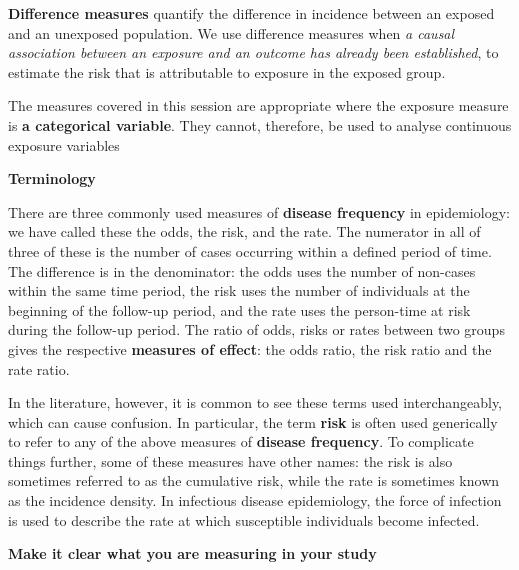 \documentclass[
  letterpaper,
  DIV=11,
  numbers=noendperiod]{scrreprt}
\begin{document}
\textbf{Difference measures} quantify the difference in incidence
between an exposed and an unexposed population. We use difference
measures when \emph{a causal association between an exposure and an
outcome has already been established}, to estimate the risk that is
attributable to exposure in the exposed group.

The measures covered in this session are appropriate where the exposure
measure is \textbf{a categorical variable}. They cannot, therefore, be
used to analyse continuous exposure variables

\begin{tcolorbox}[enhanced jigsaw, bottomtitle=1mm, breakable, colframe=quarto-callout-important-color-frame, leftrule=.75mm, opacityback=0, opacitybacktitle=0.6, left=2mm, colbacktitle=quarto-callout-important-color!10!white, coltitle=black, rightrule=.15mm, toptitle=1mm, colback=white, titlerule=0mm, title=\textcolor{quarto-callout-important-color}{\faExclamation}\hspace{0.5em}{Important}, arc=.35mm, bottomrule=.15mm, toprule=.15mm]

\textbf{Terminology}

There are three commonly used measures of \textbf{disease frequency} in
epidemiology: we have called these the odds, the risk, and the rate. The
numerator in all of three of these is the number of cases occurring
within a defined period of time. The difference is in the denominator:
the odds uses the number of non-cases within the same time period, the
risk uses the number of individuals at the beginning of the follow-up
period, and the rate uses the person-time at risk during the follow-up
period. The ratio of odds, risks or rates between two groups gives the
respective \textbf{measures of effect}: the odds ratio, the risk ratio
and the rate ratio.

In the literature, however, it is common to see these terms used
interchangeably, which can cause confusion. In particular, the term
\textbf{risk} is often used generically to refer to any of the above
measures of \textbf{disease frequency}. To complicate things further,
some of these measures have other names: the risk is also sometimes
referred to as the cumulative risk, while the rate is sometimes known as
the incidence density. In infectious disease epidemiology, the force of
infection is used to describe the rate at which susceptible individuals
become infected.

\textbf{Make it clear what you are measuring in your study}

\end{tcolorbox}
\end{document}
